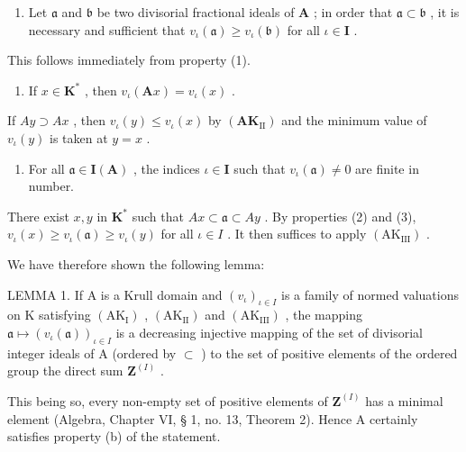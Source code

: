 \begin{enumerate}
\def\labelenumi{(\arabic{enumi})}
\setcounter{enumi}{1}
\tightlist
\item
  Let \(\mathfrak{a}\) and \(\mathfrak{b}\) be two divisorial fractional ideals of \(\mathbf{A}\) ; in order that \(\mathfrak{a} \subset \mathfrak{b}\) , it is necessary and sufficient that \(v_{\iota}(\mathfrak{a}) \geqslant v_{\iota}(\mathfrak{b})\) for all \(\iota \in \mathbf{I}\) .
\end{enumerate}

This follows immediately from property (1).

\begin{enumerate}
\def\labelenumi{(\arabic{enumi})}
\setcounter{enumi}{2}
\tightlist
\item
  If \(x \in \mathbf{K}^*\) , then \(v_{\iota}(\mathbf{A}x) = v_{\iota}(x)\) .
\end{enumerate}

If \(A y \supset A x\) , then \(v_{\iota}(y) \leqslant v_{\iota}(x)\) by \((\mathbf{A K}_{\mathrm{II}})\) and the minimum value of \(v_{\iota}(y)\) is taken at \(y = x\) .

\begin{enumerate}
\def\labelenumi{(\arabic{enumi})}
\setcounter{enumi}{3}
\tightlist
\item
  For all \(\mathfrak{a} \in \mathbf{I}(\mathbf{A})\) , the indices \(\iota \in \mathbf{I}\) such that \(v_{\iota}(\mathfrak{a}) \neq 0\) are finite in number.
\end{enumerate}

There exist \(x, y\) in \(\mathbf{K}^*\) such that \(Ax \subset \mathfrak{a} \subset Ay\) . By properties (2) and (3), \(v_{\iota}(x) \geqslant v_{\iota}(\mathfrak{a}) \geqslant v_{\iota}(y)\) for all \(\iota \in I\) . It then suffices to apply \((\mathrm{AK}_{\mathrm{III}})\) .

We have therefore shown the following lemma:

LEMMA 1. If A is a Krull domain and \((v_{\iota})_{\iota \in I}\) is a family of normed valuations on K satisfying \((\mathrm{AK}_{\mathrm{I}})\) , \((\mathrm{AK}_{\mathrm{II}})\) and \((\mathrm{AK}_{\mathrm{III}})\) , the mapping \(\mathfrak{a} \mapsto (v_{\iota}(\mathfrak{a}))_{\iota \in I}\) is a decreasing injective mapping of the set of divisorial integer ideals of A (ordered by \(\subset\) ) to the set of positive elements of the ordered group the direct sum \(\mathbf{Z}^{(I)}\) .

This being so, every non-empty set of positive elements of \(\mathbf{Z}^{(I)}\) has a minimal element (Algebra, Chapter VI, § 1, no. 13, Theorem 2). Hence A certainly satisfies property (b) of the statement.

